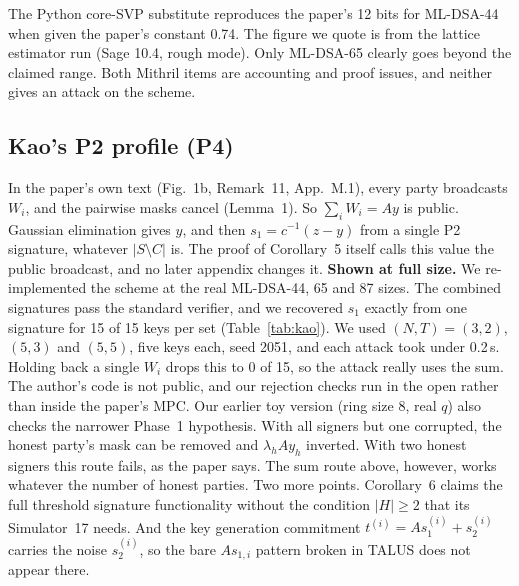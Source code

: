 \documentclass[10pt,conference,a4paper]{IEEEtran}
\begin{document}
The Python core-SVP substitute reproduces the paper's 12 bits for ML-DSA-44 when given the paper's constant 0.74. The
figure we quote is from the lattice estimator run (Sage 10.4, rough mode). Only ML-DSA-65 clearly goes beyond the claimed
range. Both Mithril items are accounting and proof issues, and neither gives an attack on the scheme.

\subsection{Kao's P2 profile (P4)}\label{sec:kao}
In the paper's own text (Fig.~1b, Remark~11, App.~M.1), every party broadcasts $W_i$, and the pairwise masks cancel
(Lemma~1). So $\sum_i W_i=Ay$ is public. Gaussian elimination gives $y$, and then $s_1=c^{-1}(z-y)$ from a single P2
signature, whatever $|S\setminus C|$ is. The proof of Corollary~5 itself calls this value the public broadcast, and no later
appendix changes it. \textbf{Shown at full size.} We re-implemented the scheme at the real ML-DSA-44, 65 and 87 sizes. The
combined signatures pass the standard verifier, and we recovered $s_1$ exactly from one signature for 15 of 15 keys per set
(Table~\ref{tab:kao}). We used $(N,T)=(3,2)$, $(5,3)$ and $(5,5)$, five keys each, seed 2051, and each attack took under
0.2\,s. Holding back a single $W_i$ drops this to 0 of 15, so the attack really uses the sum. The author's code is not
public, and our rejection checks run in the open rather than inside the paper's MPC. Our earlier toy version (ring size 8,
real $q$) also checks the narrower Phase~1 hypothesis. With all signers but one corrupted, the honest party's mask can be
removed and $\lambda_hAy_h$ inverted. With two honest signers this route fails, as the paper says. The sum route above,
however, works whatever the number of honest parties. Two more points. Corollary~6 claims the full threshold signature
functionality without the condition $|H|\ge2$ that its Simulator~17 needs. And the key generation commitment
$t^{(i)}=As_1^{(i)}+s_2^{(i)}$ carries the noise $s_2^{(i)}$, so the bare $As_{1,i}$ pattern broken in TALUS does not appear
there.
\end{document}
